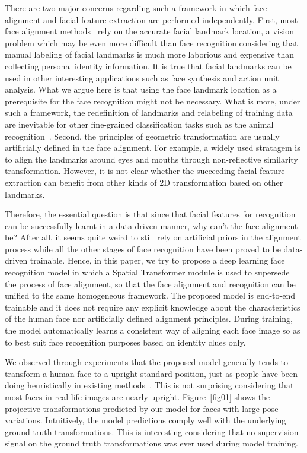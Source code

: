 \documentclass[10pt,twocolumn,letterpaper]{article}
\begin{document}
There are two major concerns regarding such a framework in which face alignment and facial feature extraction are performed independently. 
First, most face alignment methods~\cite{xiong2013supervised,ren2014face,chen2014joint,zhang2016joint} rely on the accurate facial landmark location, a vision problem which may be even more difficult than face recognition considering that manual labeling of facial landmarks is much more laborious and expensive than collecting personal identity information. 
It is true that facial landmarks can be used in other interesting applications such as face synthesis and action unit analysis. 
What we argue here is that using the face landmark location as a prerequisite for the face recognition might not be necessary. 
What is more, under such a framework, the redefinition of landmarks and relabeling of training data are inevitable for other fine-grained classification tasks such as the animal recognition~\cite{zhang2013deformable,zhang2014part}.
Second, the principles of geometric transformation are usually artificially defined in the face alignment. 
For example, a widely used stratagem is to align the landmarks around eyes and mouths through non-reflective similarity transformation. 
However, it is not clear whether the succeeding facial feature extraction can benefit from other kinds of 2D transformation based on other landmarks. 

Therefore, the essential question is that since that facial features for recognition can be successfully learnt in a data-driven manner, why can't the face alignment be? 
After all, it seems quite weird to still rely on artificial priors in the alignment process while all the other stages of face recognition have been proved to be data-driven trainable. 
Hence, in this paper, we try to propose a deep learning face recognition model in which a Spatial Transformer module \cite{jaderberg2015spatial} is used to supersede the process of face alignment, so that the face alignment and recognition can be unified to the same homogeneous framework. 
The proposed model is end-to-end trainable and it does not require any explicit knowledge about the characteristics of the human face nor artificially defined alignment principles.
During training, the model automatically learns a consistent way of aligning each face image so as to best suit face recognition purposes based on identity clues only. 

We observed through experiments that the proposed model generally tends to transform a human face to a upright standard position, just as people have been doing heuristically in existing methods~\cite{sun2014deep,yi2014learning}. 
This is not surprising considering that most faces in real-life images are nearly upright. 
Figure~\ref{fig01} shows the projective transformations predicted by our model for faces with large pose variations. Intuitively, the model predictions comply well with the underlying ground truth transformations.
This is interesting considering that no supervision signal on the ground truth transformations was ever used during model training.
\end{document}
